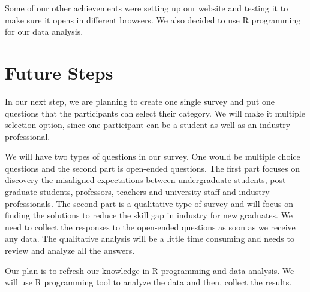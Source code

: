 \documentclass{sigchi}
\begin{document}
Some of our other achievements were setting up our website and testing it to make sure it opens in different browsers. We also decided to use R programming for our data analysis.

 \section{Future Steps}
In our next step, we are planning to create one single survey and put one questions that the participants can select their category. We will make it multiple selection option, since one participant can be a student as well as an industry professional.

We will have two types of questions in our survey. One would be multiple choice questions and the second part is open-ended questions. The first part focuses on discovery the misaligned expectations between undergraduate students, post-graduate students, professors, teachers and university staff and industry professionals. The second part is a qualitative type of survey and will focus on finding the solutions to reduce the skill gap in industry for new graduates. We need to collect the responses to the open-ended questions as soon as we receive any data. The qualitative analysis will be a little time consuming and needs to review and analyze all the answers.

Our plan is to refresh our knowledge in R programming and data analysis. We will use R programming tool to analyze the data and then, collect the results.
  

\balance{}

\balance{}



\end{document}
